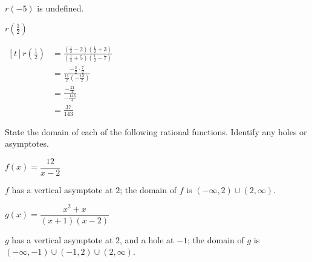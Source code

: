 \begin{exercises}
\begin{problem}
\begin{multicols}{4}
\begin{subproblem}
\begin{shortsolution}
 				$r(-5)$ is undefined.
 			\end{shortsolution}
 		\end{subproblem}
 		\begin{subproblem}
 			$r\left( \frac{1}{2} \right)$
 			\begin{shortsolution}
 				$\begin{aligned}[t]
 					r\left( \frac{1}{2} \right) & = \frac{\left( \frac{1}{2}-2 \right)\left( \frac{1}{2}+3 \right)}{\left( \frac{1}{2}+5 \right)\left( \frac{1}{2}-7 \right)} \\
 					                            & =\frac{-\frac{3}{2}\cdot\frac{7}{2}}{\frac{11}{2}\left( -\frac{13}{2} \right)}                                              \\
 					                            & =\frac{-\frac{21}{4}}{-\frac{143}{4}}                                                                                       \\
 					                            & =\frac{37}{143}                                                                                                             
 				\end{aligned}$
 			\end{shortsolution}
 		\end{subproblem}
 	\end{multicols}
 	\end{problem}
 	\begin{problem}
 	State the domain of each of the following rational functions. Identify
 	any holes or asymptotes.
 	\begin{multicols}{3}
 		\begin{subproblem}
 			$f(x)=\dfrac{12}{x-2}$
 			\begin{shortsolution}
 				$f$ has a vertical asymptote at $2$; the domain of $f$ is $(-\infty,2)\cup (2,\infty)$.
 			\end{shortsolution}
 		\end{subproblem}
 		\begin{subproblem}
 			$g(x)=\dfrac{x^2+x}{(x+1)(x-2)}$
 			\begin{shortsolution}
 				$g$ has a vertical asymptote at $2$, and a hole at $-1$; the domain of $g$ is $(-\infty,-1)\cup(-1,2)\cup(2,\infty)$.
 			\end{shortsolution}
 		\end{subproblem}
 		\begin{subproblem}

\end{subproblem}
\end{multicols}
\end{problem}
\end{exercises}
